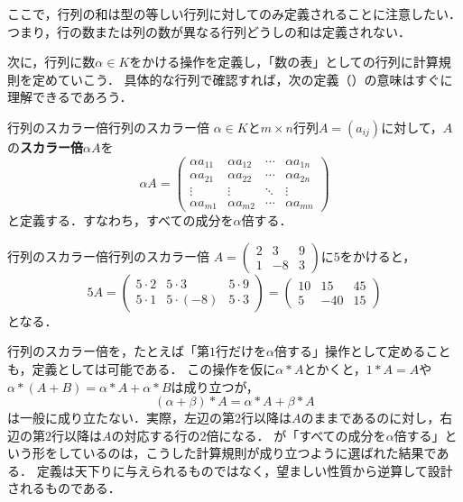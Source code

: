 ここで，行列の和は型の等しい行列に対してのみ定義されることに注意したい．
つまり，行の数または列の数が異なる行列どうしの和は定義されない．

次に，行列に数$\alpha \in K$をかける操作を定義し，「数の表」としての行列に計算規則を定めていこう．
具体的な行列で確認すれば，次の定義（）の意味はすぐに理解できるであろう．

\begin{definition}{行列のスカラー倍}{行列のスカラー倍}
  $\alpha \in K$と$m \times n$行列$A = (a_{ij})$に対して，$A$の\textbf{スカラー倍}$\alpha A$を
  \[
    \alpha A =
    \begin{pmatrix}
      \alpha a_{11} & \alpha a_{12} & \cdots & \alpha a_{1n} \\
      \alpha a_{21} & \alpha a_{22} & \cdots & \alpha a_{2n} \\
      \vdots & \vdots & \ddots & \vdots \\
      \alpha a_{m1} & \alpha a_{m2} & \cdots & \alpha a_{mn}
    \end{pmatrix}
  \]
  と定義する．すなわち，すべての成分を$\alpha$倍する．
\end{definition}


\begin{example}{行列のスカラー倍}{行列のスカラー倍}
  $A = \begin{pmatrix} 2 & 3 & 9 \\ 1 & -8 & 3 \end{pmatrix}$に$5$をかけると，
  \[
    5A =
    \begin{pmatrix}
      5 \cdot 2 & 5 \cdot 3 & 5 \cdot 9 \\
      5 \cdot 1 & 5 \cdot (-8) & 5 \cdot 3
    \end{pmatrix}
    =
    \begin{pmatrix}
      10 & 15 & 45 \\
      5 & -40 & 15
    \end{pmatrix}
  \]
  となる．
\end{example}

\begin{remark}[スカラー倍の定義の設計]
  行列のスカラー倍を，たとえば「第$1$行だけを$\alpha$倍する」操作として定めることも，定義としては可能である．
  この操作を仮に$\alpha \ast A$とかくと，$1 \ast A = A$や$\alpha \ast (A + B) = \alpha \ast A + \alpha \ast B$は成り立つが，
  \[
    (\alpha + \beta) \ast A = \alpha \ast A + \beta \ast A
  \]
  は一般に成り立たない．実際，左辺の第$2$行以降は$A$のままであるのに対し，右辺の第$2$行以降は$A$の対応する行の$2$倍になる．
  が「すべての成分を$\alpha$倍する」という形をしているのは，こうした計算規則が成り立つように選ばれた結果である．
  定義は天下りに与えられるものではなく，望ましい性質から逆算して設計されるものである．
\end{remark}

